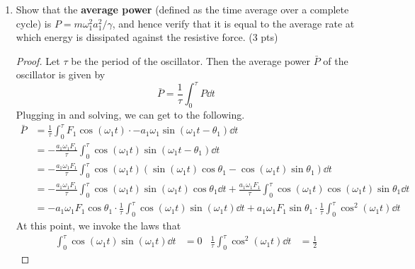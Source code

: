 \documentclass[../psets.tex]{subfiles}
\begin{document}
\begin{enumerate}
\begin{enumerate}
\begin{proof}
            From lecture, we know a particular solution of the driven, damped harmonic oscillator. It follows from the definition of power that we have
            \begin{align*}
                P &= F\dot{x}\\
                &= F_1\cos(\omega_1t)\dv{t}(a_1\cos(\omega_1t-\theta_1))\\
                \Aboxed{P &= -a_1\omega_1F_1\cos(\omega_1t)\sin(\omega_1t-\theta_1)}
            \end{align*}
        \end{proof}
        \item Show that the \textbf{average power} (defined as the time average over a complete cycle) is $P=m\omega_1^2a_1^2/\gamma$, and hence verify that it is equal to the average rate at which energy is dissipated against the resistive force. (3 pts)
        \begin{proof}
            Let $\tau$ be the period of the oscillator. Then the average power $\bar{P}$ of the oscillator is given by
            \begin{equation*}
                \bar{P} = \frac{1}{\tau}\int_0^\tau P\dd{t}
            \end{equation*}
            Plugging in and solving, we can get to the following.
            \begin{align*}
                \bar{P} &= \frac{1}{\tau}\int_0^\tau F_1\cos(\omega_1t)\cdot -a_1\omega_1\sin(\omega_1t-\theta_1)\dd{t}\\
                &= -\frac{a_1\omega_1F_1}{\tau}\int_0^\tau\cos(\omega_1t)\sin(\omega_1t-\theta_1)\dd{t}\\
                &= -\frac{a_1\omega_1F_1}{\tau}\int_0^\tau\cos(\omega_1t)(\sin(\omega_1t)\cos\theta_1-\cos(\omega_1t)\sin\theta_1)\dd{t}\\
                &= -\frac{a_1\omega_1F_1}{\tau}\int_0^\tau\cos(\omega_1t)\sin(\omega_1t)\cos\theta_1\dd{t}+\frac{a_1\omega_1F_1}{\tau}\int_0^\tau\cos(\omega_1t)\cos(\omega_1t)\sin\theta_1\dd{t}\\
                &= -a_1\omega_1F_1\cos\theta_1\cdot\frac{1}{\tau}\int_0^\tau\cos(\omega_1t)\sin(\omega_1t)\dd{t}+a_1\omega_1F_1\sin\theta_1\cdot\frac{1}{\tau}\int_0^\tau\cos^2(\omega_1t)\dd{t}
            \end{align*}
            At this point, we invoke the laws that
            \begin{align*}
                \int_0^\tau\cos(\omega_1t)\sin(\omega_1t)\dd{t} &= 0&
                \frac{1}{\tau}\int_0^\tau\cos^2(\omega_1t)\dd{t} &= \frac{1}{2}

\end{align*}
\end{proof}
\end{enumerate}
\end{enumerate}
\end{document}
